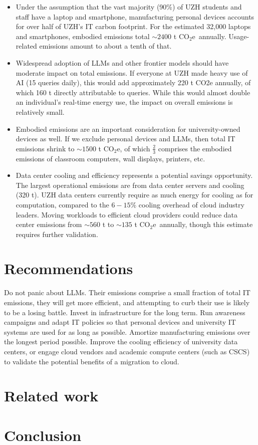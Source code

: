 \documentclass[11pt]{article}
\newcommand{\coe}{CO$_2$e}
\begin{document}
\begin{itemize}

  \item Under the assumption that the vast majority (90\%) of UZH students and staff have a laptop and smartphone, manufacturing personal devices accounts for over half of UZH's IT carbon footprint. For the estimated 32,000 laptops and smartphones, embodied emissions total $\sim 2400$ t \coe\ annually. Usage-related emissions amount to about a tenth of that.

  \item Widespread adoption of LLMs and other frontier models should have moderate impact on total emissions. If everyone at UZH made heavy use of AI (15 queries daily), this would add approximately 220 t CO2e annually, of which 160 t directly attributable to queries. While this would almost double an individual's real-time energy use, the impact on overall emissions is relatively small.

  \item Embodied emissions are an important consideration for university-owned devices as well. If we exclude personal devices and LLMs, then total IT emissions shrink to $\sim 1500$ t \coe, of which $\frac{2}{3}$ comprises the embodied emissions of classroom computers, wall displays, printers, etc.

  \item Data center cooling and efficiency represents a potential savings opportunity. The largest operational emissions are from data center servers and cooling (320 t). UZH data centers currently require as much energy for cooling as for computation, compared to the $6-15\%$ cooling overhead of cloud industry leaders. Moving workloads to efficient cloud providers could reduce data center emissions from $\sim 560$ t to $\sim 135$ t \coe\ annually, though this estimate requires further validation.

\end{itemize}

\section{Recommendations}
\label{sec:recommendations}

Do not panic about LLMs. Their emissions comprise a small fraction of total IT emissions, they will get more efficient, and attempting to curb their use is likely to be a losing battle.
Invest in infrastructure for the long term. Run awareness campaigns and adapt IT policies so that personal devices and university IT systems are used for as long as possible. Amortize manufacturing emissions over the longest period possible.
Improve the cooling efficiency of university data centers, or engage cloud vendors and academic compute centers (such as CSCS) to validate the potential benefits of a migration to cloud.

\section{Related work}
\label{sec:related:work}

\section{Conclusion}

\printbibliography
\end{document}
